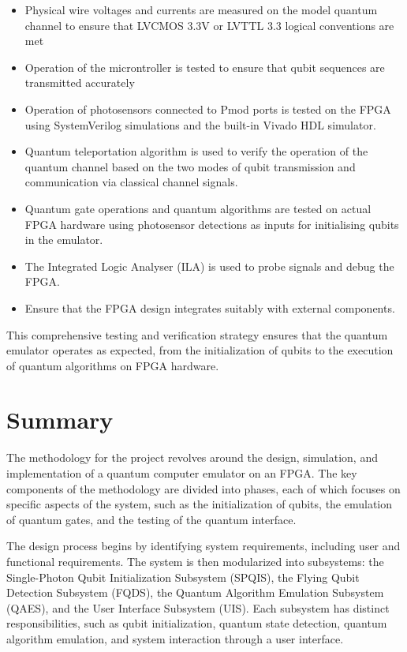 \begin{itemize}
	\item 
	Physical wire voltages and currents are measured on the model quantum channel to ensure that LVCMOS 3.3V or LVTTL 3.3 logical conventions are met
	\item 
	Operation of the microntroller is tested to ensure that qubit sequences are transmitted accurately
	\item 
	Operation of photosensors connected to Pmod ports is tested on the FPGA using SystemVerilog simulations and the built-in Vivado HDL simulator.
	\item 
	Quantum teleportation algorithm is used to verify the operation of the quantum channel based on the two modes of qubit transmission and communication via classical channel signals.
	\item 
	Quantum gate operations and quantum algorithms are tested on actual FPGA hardware using photosensor detections as inputs for initialising qubits in the emulator.\\
	\item 
	The Integrated Logic Analyser (ILA) is used to probe signals and debug the FPGA.
	\item 
	Ensure that the FPGA design integrates suitably with external components.
\end{itemize}

This comprehensive testing and verification strategy ensures that the quantum emulator operates as expected, from the initialization of qubits to the execution of quantum algorithms on FPGA hardware.

\section{Summary}

The methodology for the project revolves around the design, simulation, and implementation of a quantum computer emulator on an FPGA. The key components of the methodology are divided into phases, each of which focuses on specific aspects of the system, such as the initialization of qubits, the emulation of quantum gates, and the testing of the quantum interface.

The design process begins by identifying system requirements, including user and functional requirements. The system is then modularized into subsystems: the Single-Photon Qubit Initialization Subsystem (SPQIS), the Flying Qubit Detection Subsystem (FQDS), the Quantum Algorithm Emulation Subsystem (QAES), and the User Interface Subsystem (UIS). Each subsystem has distinct responsibilities, such as qubit initialization, quantum state detection, quantum algorithm emulation, and system interaction through a user interface.

